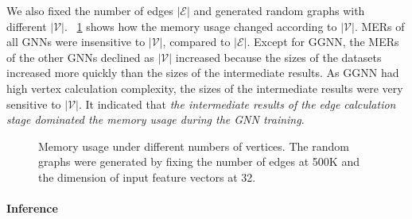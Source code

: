 We also fixed the number of edges $|\mathcal{E}|$ and generated random graphs with different $|\mathcal{V}|$.
%
\figurename~\ref{fig:exp_memory_expansion_ratio_input_graph_number_of_vertices_fixed_edge} shows how the memory usage changed according to $|\mathcal{V}|$.
%
MERs of all GNNs were insensitive to $|\mathcal{V}|$, compared to $|\mathcal{E}|$.
%
Except for GGNN, the MERs of the other GNNs declined as $|\mathcal{V}|$ increased because the sizes of the datasets increased more quickly than the sizes of the intermediate results.
%
As GGNN had high vertex calculation complexity, the sizes of the intermediate results were very sensitive to $|\mathcal{V}|$.
%
It indicated that \emph{the intermediate results of the edge calculation stage dominated the memory usage during the GNN training}.

\begin{figure}[H]
    \centering
    \caption{Memory usage under different numbers of vertices. The random graphs were generated by fixing the number of edges at 500K and the dimension of input feature vectors at 32.}
    \label{fig:exp_memory_expansion_ratio_input_graph_number_of_vertices_fixed_edge}
\end{figure}


\paragraph{Inference}

